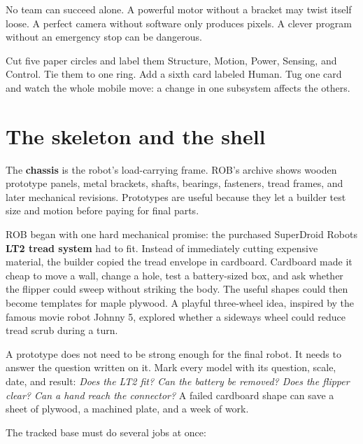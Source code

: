 \documentclass[11pt,openany]{book}
\begin{document}
No team can succeed alone. A powerful motor without a bracket may twist itself loose. A perfect camera without software only produces pixels. A clever program without an emergency stop can be dangerous.

\begin{buildbox}[title={MAKE A SYSTEMS MOBILE}]
Cut five paper circles and label them Structure, Motion, Power, Sensing, and Control. Tie them to one ring. Add a sixth card labeled Human. Tug one card and watch the whole mobile move: a change in one subsystem affects the others.
\end{buildbox}


\chapter{The skeleton and the shell}

The \textbf{chassis} is the robot's load-carrying frame. ROB's archive shows wooden prototype panels, metal brackets, shafts, bearings, fasteners, tread frames, and later mechanical revisions. Prototypes are useful because they let a builder test size and motion before paying for final parts.

ROB began with one hard mechanical promise: the purchased SuperDroid Robots \textbf{LT2 tread system} had to fit. Instead of immediately cutting expensive material, the builder copied the tread envelope in cardboard. Cardboard made it cheap to move a wall, change a hole, test a battery-sized box, and ask whether the flipper could sweep without striking the body. The useful shapes could then become templates for maple plywood. A playful three-wheel idea, inspired by the famous movie robot Johnny 5, explored whether a sideways wheel could reduce tread scrub during a turn.

\begin{fieldnotebox}[title={CARDBOARD IS A QUESTION-MAKING TOOL}]
A prototype does not need to be strong enough for the final robot. It needs to answer the question written on it. Mark every model with its question, scale, date, and result: \emph{Does the LT2 fit? Can the battery be removed? Does the flipper clear? Can a hand reach the connector?} A failed cardboard shape can save a sheet of plywood, a machined plate, and a week of work.
\end{fieldnotebox}

The tracked base must do several jobs at once:
\end{document}
